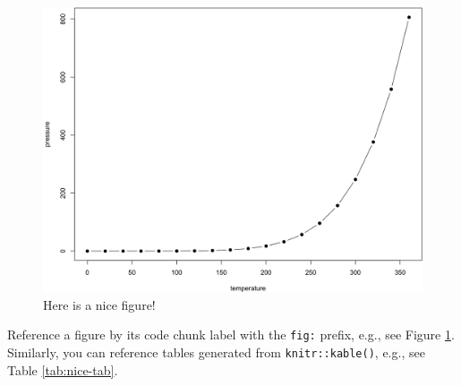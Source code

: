 \documentclass[
]{book}
\begin{document}
\begin{figure}

{\centering \includegraphics[width=0.8\linewidth]{figures/nice-fig-1} 

}

\caption{Here is a nice figure!}\label{fig:nice-fig}
\end{figure}

Reference a figure by its code chunk label with the \texttt{fig:} prefix, e.g., see Figure \ref{fig:nice-fig}. Similarly, you can reference tables generated from \texttt{knitr::kable()}, e.g., see Table \ref{tab:nice-tab}.
\end{document}
